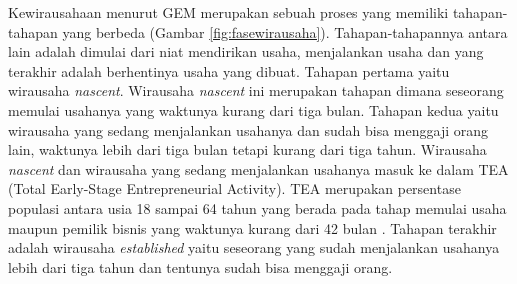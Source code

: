 Kewirausahaan menurut GEM merupakan sebuah proses yang memiliki tahapan-tahapan yang berbeda (Gambar \ref{fig:fasewirausaha}). Tahapan-tahapannya antara lain adalah dimulai dari niat mendirikan usaha, menjalankan usaha dan yang terakhir adalah berhentinya usaha yang dibuat. Tahapan pertama yaitu wirausaha \textit{nascent}. Wirausaha \textit{nascent} ini merupakan tahapan dimana seseorang memulai usahanya yang waktunya kurang dari tiga bulan. Tahapan kedua yaitu wirausaha yang sedang menjalankan usahanya dan sudah bisa menggaji orang lain, waktunya lebih dari tiga bulan tetapi kurang dari tiga tahun. Wirausaha \textit{nascent} dan wirausaha yang sedang menjalankan usahanya masuk ke dalam TEA (Total Early-Stage Entrepreneurial Activity). TEA merupakan persentase populasi antara usia 18 sampai 64 tahun yang berada pada tahap memulai usaha maupun pemilik bisnis yang waktunya kurang dari 42 bulan \cite{GEM2017}. Tahapan terakhir adalah wirausaha \textit{established} yaitu seseorang yang sudah menjalankan usahanya lebih dari tiga tahun dan tentunya sudah bisa menggaji orang.\cite{GEM2013}

